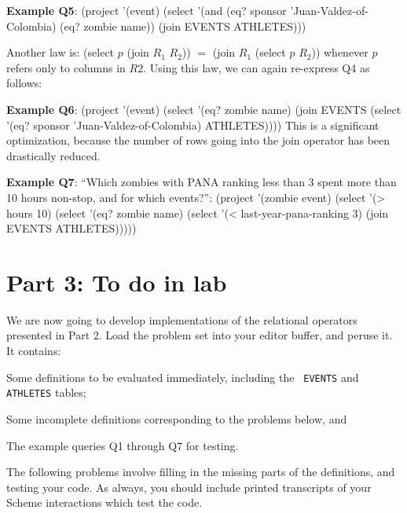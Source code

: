 {\bf Example Q5}:
 \beginlisp
(project '(event)
         (select '(and (eq? sponsor 'Juan-Valdez-of-Colombia)
                       (eq? zombie name))
                 (join EVENTS ATHLETES)))
 \endlisp

Another law is:
 \beginlisp
(select $p$ (join $R_1$ $R_2$))  $=$  (join $R_1$ (select $p$ $R_2$))
 \endlisp
 whenever $p$ refers only to columns in $R2$.  Using this law, we can again
re-express Q4 as follows:

{\bf Example Q6}:
 \beginlisp
(project '(event)
         (select '(eq? zombie name)
                 (join EVENTS
                       (select '(eq? sponsor 'Juan-Valdez-of-Colombia)
                                ATHLETES))))
 \endlisp
 This is a significant optimization, because the number of rows going
into the {\cf join} operator has been drastically reduced.

{\bf Example Q7}: ``Which zombies with PANA ranking less than 3 spent more
than 10 hours non-stop, and for which events?'': 
 \beginlisp
(project '(zombie event)
         (select '(> hours 10)
                 (select '(eq? zombie name)
                         (select '(< last-year-pana-ranking 3)
                                 (join EVENTS
                                       ATHLETES)))))
 \endlisp


\section{Part 3: To do in lab}

We are now going to develop implementations of the relational operators
presented in Part 2.  Load the problem set into your editor buffer, and
peruse it.  It contains:

\begin{tightlist}

\item Some definitions to be evaluated immediately, including the {\tt
EVENTS} and {\tt ATHLETES} tables;

\item Some incomplete definitions corresponding to the problems below, and

\item The example queries Q1 through Q7 for testing.

\end{tightlist}

The following problems involve filling in the missing parts of the
definitions, and testing your code.  As always, you should include printed
transcripts of your Scheme interactions which test the code.

